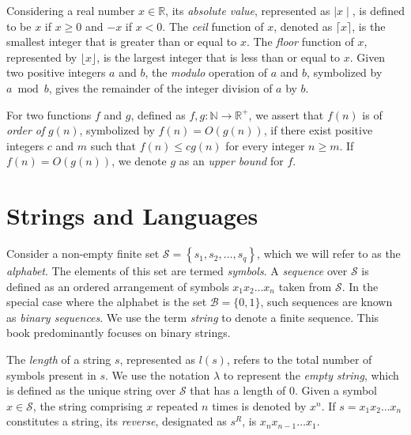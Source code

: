 Considering a real number $x \in \mathbb{R}$, its \emph{absolute value}, represented as $\mid x \mid$, is defined to be $x$ if $x \geq 0$ and $-x$ if $x < 0$. The \emph{ceil} function of $x$, denoted as $\lceil x \rceil$, is the smallest integer that is greater than or equal to $x$. The \emph{floor} function of $x$, represented by $\lfloor x \rfloor$, is the largest integer that is less than or equal to $x$. Given two positive integers $a$ and $b$, the \emph{modulo} operation of $a$ and $b$, symbolized by $a \bmod b$, gives the remainder of the integer division of $a$ by $b$.

For two functions $f$ and $g$, defined as $f,g:\mathbb{N}\rightarrow\mathbb{R}^{+}$, we assert that $f(n)$ is of \emph{order of} $g(n)$, symbolized by $f(n)=O(g(n))$, if there exist positive integers $c$ and $m$ such that $f(n)\leq cg(n)$ for every integer $n \geq m$. If $f(n)=O(g(n))$, we denote $g$ as an \emph{upper bound} for $f$.

%
%

\section{Strings and Languages}
\label{sec:strings}

Consider a non-empty finite set $\mathcal{S}=\left\{ s_{1},s_{2},\ldots,s_{q}\right\}$, which we will refer to as the \emph{alphabet}. The elements of this set are termed \emph{symbols}. A \emph{sequence} over $\mathcal{S}$ is defined as an ordered arrangement of symbols $x_1 x_2 \dots x_n$ taken from $\mathcal{S}$. In the special case where the alphabet is the set $\mathcal{B} = \{0, 1\}$, such sequences are known as \emph{binary sequences}. We use the term \emph{string} to denote a finite sequence. This book predominantly focuses on binary strings. 

The \emph{length} of a string $s$, represented as $l(s)$, refers to the total number of symbols present in $s$. We use the notation $\lambda$ to represent the \emph{empty string}, which is defined as the unique string over $\mathcal{S}$ that has a length of 0. Given a symbol $x \in \mathcal{S}$, the string comprising $x$ repeated $n$ times is denoted by $x^n$. If $s = x_1 x_2 \dots x_n$ constitutes a string, its \emph{reverse}, designated as $s^R$, is $x_n x_{n-1} \dots x_1$.

